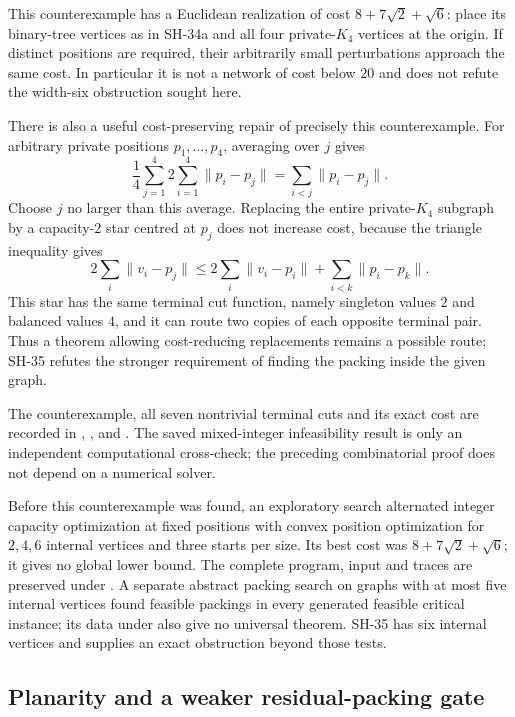 This counterexample has a Euclidean realization of cost
$8+7\sqrt2+\sqrt6$: place its binary-tree vertices as in
SH-34a and all four private-$K_4$ vertices at the origin.
If distinct positions are required, their arbitrarily small
perturbations approach the same cost.  In particular it is
not a network of cost below $20$ and does not refute the
width-six obstruction sought here.

There is also a useful cost-preserving repair of precisely
this counterexample.  For arbitrary private positions
$p_1,\ldots,p_4$, averaging over $j$ gives
\[
 \frac14\sum_{j=1}^4 2\sum_{i=1}^4\|p_i-p_j\|
       =\sum_{i<j}\|p_i-p_j\|.
\]
Choose $j$ no larger than this average.  Replacing the entire
private-$K_4$ subgraph by a capacity-$2$ star centred at $p_j$
does not increase cost, because the triangle inequality gives
\[
 2\sum_i\|v_i-p_j\|
 \le 2\sum_i\|v_i-p_i\|+\sum_{i<k}\|p_i-p_k\|.
\]
This star has the same terminal cut function, namely singleton
values $2$ and balanced values $4$, and it can route two
copies of each opposite terminal pair.  Thus a theorem
allowing cost-reducing replacements remains a possible route;
SH-35 refutes the stronger requirement of finding the packing
inside the given graph.

The counterexample, all seven nontrivial terminal cuts and
its exact cost are recorded in
,
, and
.
The saved mixed-integer infeasibility result is only an
independent computational cross-check; the preceding
combinatorial proof does not depend on a numerical solver.

Before this counterexample was found, an exploratory search
alternated integer capacity optimization at fixed positions
with convex position optimization for $2,4,6$ internal
vertices and three starts per size.  Its best cost was
$8+7\sqrt2+\sqrt6$; it gives no global lower bound.  The
complete program, input and traces are preserved under
.  A separate abstract
packing search on graphs with at most five internal vertices
found feasible packings in every generated feasible critical
instance; its data under 
also give no universal theorem.  SH-35 has six internal
vertices and supplies an exact obstruction beyond those
tests.

\subsection{Planarity and a weaker residual-packing gate}

